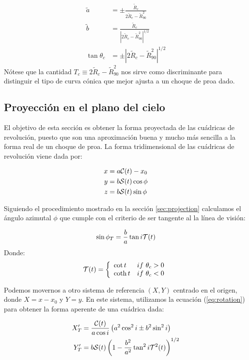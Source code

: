 \begin{align}
  \tilde{a} &= \pm\frac{\tilde{R}_c}{2\tilde{R}_c - \tilde{R}_{90}^2} \\
  \tilde{b} &= \frac{\tilde{R}_c}{\left|2\tilde{R}_c - \tilde{R}_{90}^2\right|^{1/2}}\\
  \tan\theta_c &= \pm\left|2\tilde{R}_c - \tilde{R}_{90}^2\right|^{1/2}
\end{align}
Nótese que la cantidad $T_c\equiv 2\tilde{R}_c - \tilde{R}_{90}^2$ nos sirve como discriminante para
distinguir el tipo de curva cónica que mejor ajusta a un choque de proa dado.

\subsection{Proyección en el plano del cielo}

El objetivo de esta sección es obtener la forma proyectada de las cuádricas de revolución,
puesto que son una aproximación buena y mucho más sencilla a la forma real de un choque de
proa.
La forma tridimensional de las cuádricas de revolución viene dada por:

\begin{align}
  x &= a\mathcal{C}(t) - x_0 \\
  y &= b\mathcal{S}(t)\cos\phi \\
  z &= b\mathcal{S}(t)\sin\phi
\end{align}

Siguiendo el procedimiento mostrado en la sección \ref{sec:projection} calculamos el ángulo
azimutal $\phi$ que cumple con el criterio de ser tangente al la línea de visión:

\begin{align}
  \sin\phi_T = \frac{b}{a}\tan i\mathcal{T}(t) 
\end{align}
Donde:
\begin{align}
  \mathcal{T}(t) = \left\lbrace
  \begin{array}{lr}
    \cot t & if~\theta_c > 0 \\
    \coth t & if~\theta_c < 0 
  \end{array}
  \right.
\end{align}

Podemos movernos a otro sistema de referencia $(X, Y)$ centrado en el origen, donde
$X = x - x_0$ y $Y =y$. En este sistema, utilizamos la ecuación (\ref{eq:rotation})
para obtener la forma aperente de una cuádrica dada:

\begin{align}
  X'_T &= \frac{\mathcal{C}(t)}{a\cos i}\left(a^2\cos^2 i \pm b^2\sin^2 i\right)
  \label{eq:x-prime-proj}\\
  Y'_T &= b\mathcal{S}(t)\left(1 - \frac{b^2}{a^2}\tan^2 i\mathcal{T}^2(t)\right)^{1/2}
  \label{eq:y-prime-proj}
\end{align}

